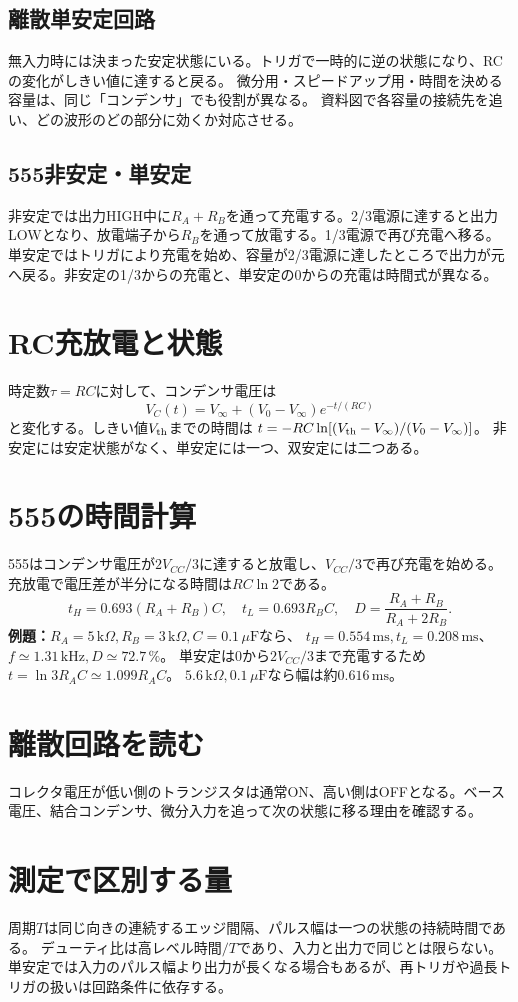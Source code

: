 \documentclass[lualatex,a4paper,10pt]{jlreq}
\begin{document}
\subsection{離散単安定回路}
無入力時には決まった安定状態にいる。トリガで一時的に逆の状態になり、RCの変化がしきい値に達すると戻る。
微分用・スピードアップ用・時間を決める容量は、同じ「コンデンサ」でも役割が異なる。
資料図で各容量の接続先を追い、どの波形のどの部分に効くか対応させる。
\clearpage
\subsection{555非安定・単安定}
非安定では出力HIGH中に$R_A+R_B$を通って充電する。2/3電源に達すると出力LOWとなり、放電端子から$R_B$を通って放電する。1/3電源で再び充電へ移る。
単安定ではトリガにより充電を始め、容量が2/3電源に達したところで出力が元へ戻る。非安定の1/3からの充電と、単安定の0からの充電は時間式が異なる。

\section{RC充放電と状態}\label{sec:auto3}
時定数$\tau=RC$に対して、コンデンサ電圧は
\[
 V_C(t)=V_\infty+(V_0-V_\infty)e^{-t/(RC)}
\]
と変化する。しきい値$V_{\rm th}$までの時間は
$t=-RC\ln[(V_{\rm th}-V_\infty)/(V_0-V_\infty)]$。
非安定には安定状態がなく、単安定には一つ、双安定には二つある。
\section{555の時間計算}\label{sec:auto4}
555はコンデンサ電圧が$2V_{CC}/3$に達すると放電し、$V_{CC}/3$で再び充電を始める。
充放電で電圧差が半分になる時間は$RC\ln2$である。
\[
 t_H=0.693(R_A+R_B)C,\quad t_L=0.693R_BC,\quad
 D=\frac{R_A+R_B}{R_A+2R_B}.
\]
\textbf{例題：}$R_A=5\,\mathrm{k}\Omega,R_B=3\,\mathrm{k}\Omega,C=0.1\,\mu\mathrm{F}$なら、
$t_H=0.554\,\mathrm{ms},t_L=0.208\,\mathrm{ms}$、
$f\simeq1.31\,\mathrm{kHz},D\simeq72.7\,\%$。
単安定は0から$2V_{CC}/3$まで充電するため$t=\ln3R_AC\simeq1.099R_AC$。
$5.6\,\mathrm{k}\Omega,0.1\,\mu\mathrm{F}$なら幅は約$0.616\,\mathrm{ms}$。
\section{離散回路を読む}\label{sec:auto5}
コレクタ電圧が低い側のトランジスタは通常ON、高い側はOFFとなる。ベース電圧、結合コンデンサ、微分入力を追って次の状態に移る理由を確認する。
\writing{24mm}
\clearpage
\section{測定で区別する量}\label{sec:auto6}
周期$T$は同じ向きの連続するエッジ間隔、パルス幅は一つの状態の持続時間である。
デューティ比は高レベル時間$/T$であり、入力と出力で同じとは限らない。
単安定では入力のパルス幅より出力が長くなる場合もあるが、再トリガや過長トリガの扱いは回路条件に依存する。
\end{document}
